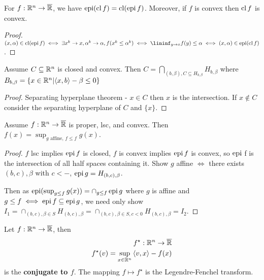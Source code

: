 \begin{thm}
  \label{sec:conjugate-functions-3}
  For $f: \mathbb{R}^{n} \rightarrow \overline {\mathbb{R}}$, we have $\operatorname*{epi} (\operatorname*{cl} f) =
  \operatorname*{cl} (\operatorname*{epi} f)$.  Moreover, if $f$ is convex then $\operatorname*{cl} f$ is convex.
\end{thm}

\begin{proof}
  $(x, \alpha) \in \cl(\epi f) \iff \exists x^{k} \rightarrow x,
  \alpha^{k} \rightarrow \alpha, f(x^{k} \leq \alpha^{k}) \iff
  \lininf_{y \rightarrow x} f(y) \leq \alpha \iff (x, \alpha) \in \epi
  (\cl f)$.
\end{proof}

\begin{thm}
  \label{sec:conjugate-functions-4}
  Assume $C \subseteq \mathbb{R}^{n}$ is closed and convex.  Then $C =
  \bigcap_{(b, \beta), C \subseteq H_{b, \beta}} H_{b, \beta}$ where
  $B_{b, \beta} = \{ x \in \R^{n} | \IP{x, b} - \beta \leq 0 \} $
\end{thm}

\begin{proof}
  Separating hyperplane theorem - $x \in C$ then $x$ is the
  intersection. If $x \notin C$ consider the separating hyperplane of
  $C$ and $\{ x \} $.
\end{proof}

\begin{thm}
  \label{sec:conjugate-functions-5}
  Assume $f: \mathbb{R}^{n} \rightarrow \overline {\mathbb{R}}$ is proper, lsc, and
  convex.  Then $f(x) = \sup_{\text{$g$ affine, $f \leq f$}} g(x)$.
\end{thm}

\begin{proof}
  $f$ lsc implies $\operatorname*{epi} f$ is closed, $f$ is convex implies $\operatorname*{epi} f$ is
  convex, so $\operatorname*{epi} $ f is the intersection of all half spaces
  containing it.  Show $g$ affine $\iff$ there exists $(b, c), \beta$
  with $c < -$, $\operatorname*{epi} g = H_{(b, c), \beta}$.

  Then as $\operatorname*{epi} (\sup_{g \leq f} g(x)) = \cap_{g \leq f} \operatorname*{epi} g$
  where $g$ is affine and $g \leq f \iff \operatorname*{epi} f \subseteq \operatorname*{epi} g$, we
  need only show $I_{1} = \cap_{(b, c), \beta \in S} H_{(b, c), \beta}
  = \cap_{(b, c), \beta \in S, c < 0} H_{(b, c), \beta} = I_{2}$.
\end{proof}

\begin{defn}
  \label{sec:conjugate-functions-6}
  Let $f: \mathbb{R}^{n} \rightarrow \overline {\mathbb{R}}$, then
  \begin{align}
    \label{eq:8}
    f^{\star}: \R^{n} \rightarrow \overline \R \\
    f^{\star}(v) = \sup_{x \in \R^{n}} \IP{v, x} - f(x)
  \end{align} is the \textbf{conjugate to $f$}.  The mapping $f
  \mapsto f^{\star}$ is the Legendre-Fenchel transform.
\end{defn}

